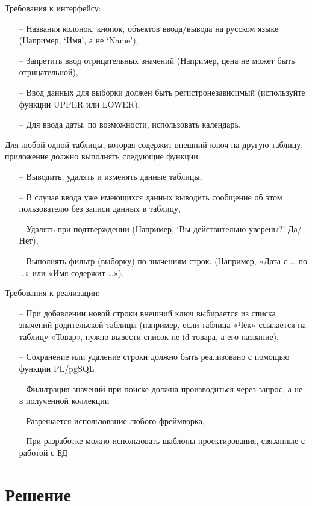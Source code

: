 \documentclass[a4paper,14pt]{extarticle}
\begin{document}
  Требования к интерфейсу:
  \begin{itemize}
    \item[--] Названия колонок, кнопок, объектов ввода/вывода на русском языке (Например, ‘Имя’, а не ‘Name’),
    \item[--] Запретить ввод отрицательных значений (Например, цена не может быть отрицательной),
    \item[--] Ввод данных для выборки должен быть регистронезависимый (используйте функции UPPER или LOWER),
    \item[--] Для ввода даты, по возможности, использовать календарь.
  \end{itemize}

  Для любой одной таблицы, которая содержит внешний ключ на другую таблицу, приложение должно выполнять следующие функции:
  \begin{itemize}
    \item[--] Выводить, удалять и изменять данные таблицы,
    \item[--] В случае ввода уже имеющихся данных выводить сообщение об этом пользователю без записи данных в таблицу,
    \item[--] Удалять при подтверждении (Например, ‘Вы действительно уверены?’ Да/Нет),
    \item[--] Выполнять фильтр (выборку) по значениям строк. (Например, «Дата с … по …» или «Имя содержит …»).
  \end{itemize}

  Требования к реализации:
  \begin{itemize}
    \item[--] При добавлении новой строки внешний ключ выбирается из списка значений родительской таблицы (например, если таблица «Чек» ссылается на таблицу «Товар», нужно вывести список не id товара, а его название),
    \item[--] Сохранение или удаление строки должно быть реализовано с помощью функции PL/pgSQL
    \item[--] Фильтрация значений при поиске должна производиться через запрос, а не в полученной коллекции
    \item[--] Разрешается использование любого фреймворка,
    \item[--] При разработке можно использовать шаблоны проектирования, связанные с работой с БД
  \end{itemize}

  \pagebreak
  \section*{Решение}
\end{document}
